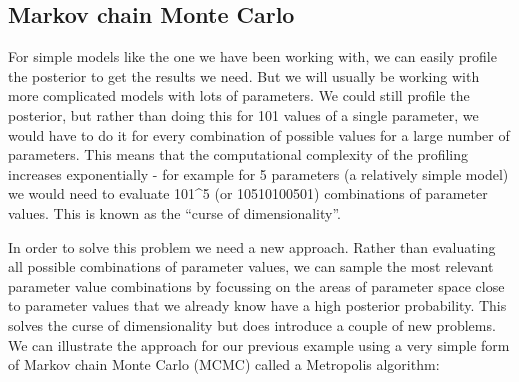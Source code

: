 \documentclass[
  12pt,
]{article}
\begin{document}
\hypertarget{markov-chain-monte-carlo}{%
\subsection{Markov chain Monte Carlo}\label{markov-chain-monte-carlo}}

For simple models like the one we have been working with, we can easily
profile the posterior to get the results we need. But we will usually be
working with more complicated models with lots of parameters. We could
still profile the posterior, but rather than doing this for 101 values
of a single parameter, we would have to do it for every combination of
possible values for a large number of parameters. This means that the
computational complexity of the profiling increases exponentially - for
example for 5 parameters (a relatively simple model) we would need to
evaluate 101\^{}5 (or 10510100501) combinations of parameter values.
This is known as the ``curse of dimensionality''.

In order to solve this problem we need a new approach. Rather than
evaluating all possible combinations of parameter values, we can sample
the most relevant parameter value combinations by focussing on the areas
of parameter space close to parameter values that we already know have a
high posterior probability. This solves the curse of dimensionality but
does introduce a couple of new problems. We can illustrate the approach
for our previous example using a very simple form of Markov chain Monte
Carlo (MCMC) called a Metropolis algorithm:
\end{document}
